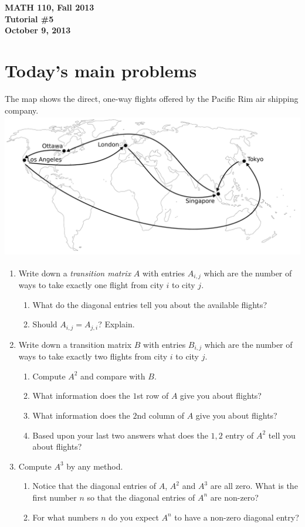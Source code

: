 \documentclass[11pt]{exam}
\newcommand{\mthCourse}{MATH 110}
\newcommand{\mthTerm}{Fall 2013}
\newcommand{\mthTutorialNumber}{5}
\newcommand{\mthDate}{October 9, 2013}
\begin{document}
{\large
	\begin{center}
		{\bf \mthCourse, \mthTerm}\\ 
		{\bf Tutorial \#\mthTutorialNumber}\\
		{\bf \mthDate}
	\end{center}
}

\section*{Today's main problems}
	The map shows the direct, one-way flights offered by the Pacific
	Rim air shipping company.
	\includegraphics[height=2.5in]{flight_map.pdf}


\begin{enumerate}
	\item Write down a \emph{transition matrix} $A$ with entries $A_{i,j}$ which 
	are the number of ways to take exactly one flight from city $i$ to city $j$.
	\begin{enumerate}
		\item What do the diagonal entries tell you about the available flights?
		\item Should $A_{i,j} = A_{j,i}$? Explain.
	\end{enumerate}
	\item Write down a transition matrix $B$ with entries $B_{i,j}$ which are the 
	number of ways to take exactly two flights from city $i$ to city $j$.
	\begin{enumerate}
		\item Compute $A^2$ and compare with $B$.
		\item What information does the $1$st row of $A$ give you about flights?
		\item What information does the $2$nd column of $A$ give you about 
		flights?
		\item Based upon your last two answers what does the $1,2$ entry of 
		$A^2$ tell you about flights?
	\end{enumerate}
	\item Compute $A^3$ by any method.
		\begin{enumerate}
			\item Notice that the diagonal entries of $A$, $A^2$ and 
			$A^3$ are all zero. What is the first number $n$ so that 
			the diagonal entries of $A^n$ are non-zero?
			\item For what numbers $n$ do you expect $A^n$ to have a 
			non-zero diagonal entry? 
		\end{enumerate}
\end{enumerate}
\end{document}
